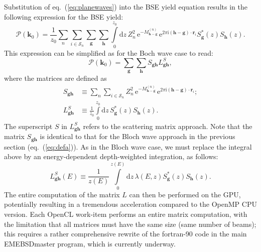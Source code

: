 \documentclass[DIV=calc, paper=letter, fontsize=11pt]{scrartcl}	 %
\begin{document}
{Substitution of eq.~(\ref{eq:planewaves}) into the BSE yield equation results in the following expression 
for the BSE yield:
\begin{equation}
	\mathcal{P}(\mathbf{k}_0) = \frac{1}{z_0}\sum_{n}\sum_{i\in\mathcal{S}_n}\sum_{\mathbf{g}}\sum_{\mathbf{h}} \int\limits_{0}^{z_{0}} \mathrm{d}z\,
	 Z^2_n\,\mathrm{e}^{-M^{(n)}_{\mathbf{h}-\mathbf{g}}}\,\mathrm{e}^{2\pi\mathrm{i} (\mathbf{h}-\mathbf{g})\cdot\mathbf{r}_{i}} 
	S^{\ast}_{\mathbf{g}}(z) S_{\mathbf{h}}(z).
    \label{eq:prob2}
\end{equation}
This expression can be simplified as for the Boch wave case to read:
\begin{equation}
	\mathcal{P}(\mathbf{k}_0) = \sum_{\mathbf{g}}\sum_{\mathbf{h}} S_{\mathbf{g}\mathbf{h}} L^{S}_{\mathbf{g}\mathbf{h}},
    \label{eq:prob2}
\end{equation}
where the matrices are defined as
\begin{subequations}
\begin{align}
    S_{\mathbf{g}\mathbf{h}} &\equiv \sum_{n}\sum_{i\in\mathcal{S}_n} Z^2_n\,\mathrm{e}^{-M^{(n)}_{\mathbf{h}-\mathbf{g}}}\,\mathrm{e}^{2\pi\mathrm{i} 
    (\mathbf{h}-\mathbf{g})\cdot\mathbf{r}_{i}};\label{eq:defnewa}\\
    L^{S}_{\mathbf{g}\mathbf{h}} &\equiv \frac{1}
    {z_{0}}\int\limits_{0}^{z_{0}} \mathrm{d}z\,  S^{\ast}_{\mathbf{g}}(z) S_{\mathbf{h}}(z).
    \label{eq:defnewb}
\end{align}
\end{subequations}
The superscript $S$ in $L^{S}_{\mathbf{g}\mathbf{h}}$ refers to the scattering matrix approach.  Note that the matrix 
$S_{\mathbf{g}\mathbf{h}}$ is identical to that for the Bloch wave approach in the previous section (eq.~(\ref{eq:defa})).  
As in the Bloch wave case, we must replace the integral above by an energy-dependent depth-weighted integration, as follows:
\begin{equation}
	L^{S}_{\mathbf{g}\mathbf{h}}(E) \equiv  \frac{1}{z(E)}\int\limits_{0}^{z(E)} \mathrm{d}z\,  
    \lambda(E,z) S^{\ast}_{\mathbf{g}}(z) S_{\mathbf{h}}(z).
\end{equation}
The entire computation of the matrix $L$ can then be performed on the GPU, potentially resulting in a tremendous acceleration compared to the 
OpenMP CPU version.  Each OpenCL work-item performs an entire matrix computation, with the limitation that all 
matrices must have the same size (same number of beams); this requires a rather comprehensive rewrite of the fortran-90 
code in the main \textsf{EMEBSDmaster} program, which is currently underway.
}
\end{document}
